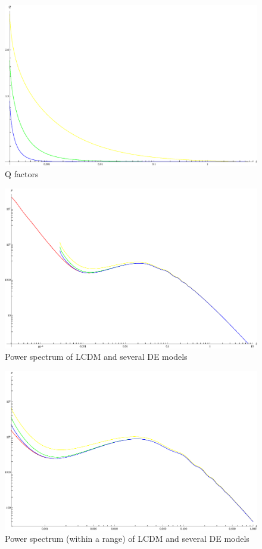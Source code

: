 \documentclass{article}
\begin{document}
\begin{figure}[!htbp]
\centering
\includegraphics[width=400pt]{DE_QFactors.eps} 
\caption{Q factors}\label{fig:DE_QFactors}
\end{figure}



\begin{figure}[!htbp]
\centering
\includegraphics[width=400pt]{DE_PowerSpectrums.eps}
\caption{Power spectrum of LCDM and several DE models}\label{fig:DE_PowerSpectrums}
\end{figure}

\begin{figure}[!htbp]
\centering
\includegraphics[width=400pt]{DE_PowerSpectrums_Cut.eps}
\caption{Power spectrum (within a range) of LCDM and several DE models}\label{fig:DE_PowerSpectrums_Cut}
\end{figure}
\end{document}
